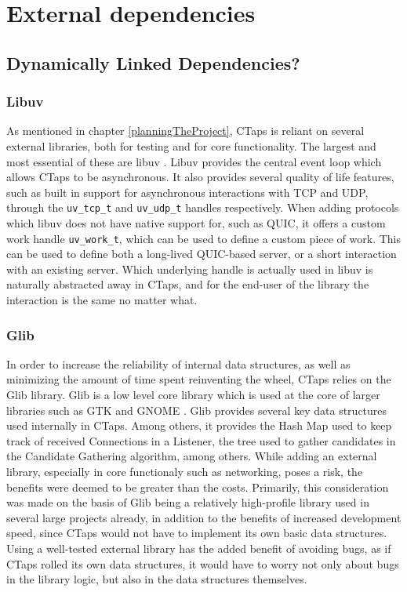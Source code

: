 \chapter{External dependencies}

\section{Dynamically Linked Dependencies?} 
\subsection{Libuv}
As mentioned in chapter \ref{planningTheProject}, CTaps is reliant on several
external libraries, both for testing and for core functionality. The largest
and most essential of these are libuv \cite{Libuv2025}. Libuv provides the central
event loop which allows CTaps to be asynchronous. It also provides several quality
of life features, such as built in support for asynchronous interactions with TCP
and UDP, through the \texttt{uv\_tcp\_t} and \texttt{uv\_udp\_t} handles respectively.
When adding protocols which libuv does not have native support for, such as QUIC,
it offers a custom work handle \texttt{uv\_work\_t}, which can be used to define
a custom piece of work. This can be used to define both a long-lived QUIC-based
server, or a short interaction with an existing server. Which underlying handle
is actually used in libuv is naturally abstracted away in CTaps, and for the
end-user of the library the interaction is the same no matter what. 

\subsection{Glib}
In order to increase the reliability of internal data structures, as well as
minimizing the amount of time spent reinventing the wheel, CTaps relies on the
Glib library. Glib is a low level core library which is used at the core of
larger libraries such as GTK and GNOME . Glib provides several
key data structures used internally in CTaps. Among others, it provides the
Hash Map used to keep track of received Connections in a Listener, the tree
used to gather candidates in the Candidate Gathering algorithm, among others.
While adding an external library, especially in core functionaly such as networking,
poses a risk, the benefits were deemed to be greater than the costs. Primarily,
this consideration was made on the basis of Glib being a relatively high-profile
library used in several large projects already, in addition to the benefits of
increased development speed, since CTaps would not have to implement its own 
basic data structures. Using a well-tested external library has the added benefit
of avoiding bugs, as if CTaps rolled its own data structures, it would have
to worry not only about bugs in the library logic, but also in the
data structures themselves.

